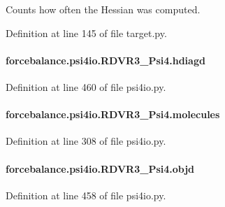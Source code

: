 Counts how often the Hessian was computed. 



Definition at line 145 of file target.\-py.

\hypertarget{classforcebalance_1_1psi4io_1_1RDVR3__Psi4_a0faae382ff2a46e2fa9b843a2963a5b8}{
\paragraph[{hdiagd}]{\setlength{\rightskip}{0pt plus 5cm}forcebalance.\-psi4io.\-R\-D\-V\-R3\-\_\-\-Psi4.\-hdiagd}}\label{classforcebalance_1_1psi4io_1_1RDVR3__Psi4_a0faae382ff2a46e2fa9b843a2963a5b8}


Definition at line 460 of file psi4io.\-py.

\hypertarget{classforcebalance_1_1psi4io_1_1RDVR3__Psi4_ae0490cebed3a59e1989031dd63872d3c}{
\paragraph[{molecules}]{\setlength{\rightskip}{0pt plus 5cm}forcebalance.\-psi4io.\-R\-D\-V\-R3\-\_\-\-Psi4.\-molecules}}\label{classforcebalance_1_1psi4io_1_1RDVR3__Psi4_ae0490cebed3a59e1989031dd63872d3c}


Definition at line 308 of file psi4io.\-py.

\hypertarget{classforcebalance_1_1psi4io_1_1RDVR3__Psi4_a5e419082b7b8baf9cf55e4f6f272053e}{
\paragraph[{objd}]{\setlength{\rightskip}{0pt plus 5cm}forcebalance.\-psi4io.\-R\-D\-V\-R3\-\_\-\-Psi4.\-objd}}\label{classforcebalance_1_1psi4io_1_1RDVR3__Psi4_a5e419082b7b8baf9cf55e4f6f272053e}


Definition at line 458 of file psi4io.\-py.

